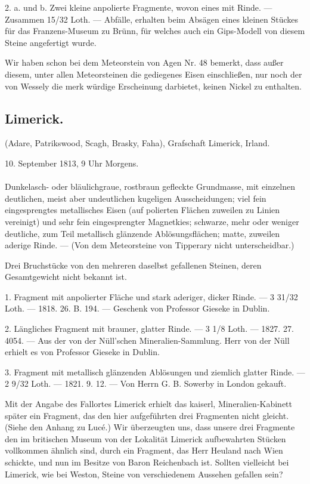 \documentclass[a4paper, 11pt, oneside, polutonikogreek, german]{article}
\begin{document}
2. a. und b. Zwei kleine anpolierte Fragmente, wovon eines mit Rinde. — Zusammen 15/32 Loth. — Abfälle, erhalten beim Absägen eines kleinen Stückes für das Franzens-Museum zu Brünn, für welches auch ein Gips-Modell von diesem Steine angefertigt wurde.

Wir haben schon bei dem Meteorstein von Agen Nr. 48 bemerkt, dass außer diesem, unter allen Meteorsteinen die gediegenes Eisen einschließen, nur noch der von Wessely die merk würdige Erscheinung darbietet, keinen Nickel zu enthalten.
\subsection{Limerick.}
\begin{center}
\small
(Adare, Patrikswood, Scagh, Brasky, Faha), Grafschaft Limerick, Irland.

10. September 1813, 9 Uhr Morgens.
\end{center}
\paragraph{}
Dunkelasch- oder bläulichgraue, rostbraun gefleckte Grundmasse, mit einzelnen deutlichen, meist aber undeutlichen kugeligen Ausscheidungen; viel fein eingesprengtes metallisches Eisen (auf polierten Flächen zuweilen zu Linien vereinigt) und sehr fein eingesprengter Magnetkies; schwarze, mehr oder weniger deutliche, zum Teil metallisch glänzende Ablösungsflächen; matte, zuweilen aderige Rinde. — (Von dem Meteorsteine von Tipperary nicht unterscheidbar.)

Drei Bruchstücke von den mehreren daselbst gefallenen Steinen, deren Gesamtgewicht nicht bekannt ist.

1. Fragment mit anpolierter Fläche und stark aderiger, dicker Rinde. — 3 31/32 Loth. — 1818. 26. B. 194. — Geschenk von Professor Gieseke in Dublin.

2. Längliches Fragment mit brauner, glatter Rinde. — 3 1/8 Loth. — 1827. 27. 4054. — Aus der von der Nüll'schen Mineralien-Sammlung. Herr von der Nüll erhielt es von Professor Gieseke in Dublin.

3. Fragment mit metallisch glänzenden Ablösungen und ziemlich glatter Rinde. — 2 9/32 Loth. — 1821. 9. 12. — Von Herrn G. B. Sowerby in London gekauft.

Mit der Angabe des Fallortes Limerick erhielt das kaiserl, Mineralien-Kabinett später ein Fragment, das den hier aufgeführten drei Fragmenten nicht gleicht. (Siehe den Anhang zu Lucé.) Wir überzeugten uns, dass unsere drei Fragmente den im britischen Museum von der Lokalität Limerick aufbewahrten Stücken vollkommen ähnlich sind, durch ein Fragment, das Herr Heuland nach Wien schickte, und nun im Besitze von Baron Reichenbach ist. Sollten vielleicht bei Limerick, wie bei Weston, Steine von verschiedenem Aussehen gefallen sein?
\end{document}

